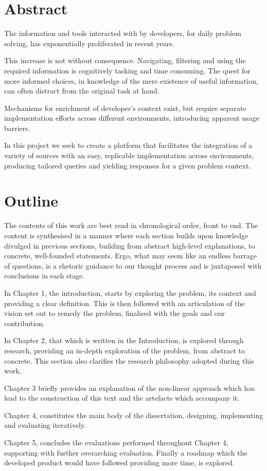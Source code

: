 \chapter*{Abstract}

The information and tools interacted with by developers, for daily problem solving, has exponentially proliferated in recent years. 

This increase is not without consequence. Navigating, filtering and using the required information is cognitively tasking and time consuming. The quest for more informed choices, in knowledge of the mere existence of useful information, can often distract from the original task at hand. 

Mechanisms for enrichment of developer's context exist, but require separate implementation efforts across different environments, introducing apparent usage barriers.

In this project we seek to create a platform that facilitates the integration of a variety of sources with an easy, replicable implementation across environments, producing tailored queries and yielding responses for a given problem context.  



\chapter*{Outline}

The contents of this work are best read in chronological order, front to end. The content is synthesised in a manner where each section builds upon knowledge divulged in previous sections, building from abstract high-level explanations, to concrete, well-founded statements. Ergo, what may seem like an endless barrage of questions, is a rhetoric guidance to our thought process and is juxtaposed with conclusions in each stage.

In Chapter 1, the introduction, starts by exploring the problem, its context and providing a clear definition. This is then followed with an articulation of the vision set out to remedy the problem, finalised with the goals and our contribution.

In Chapter 2, that which is written in the Introduction, is explored through research, providing an in-depth exploration of the problem, from abstract to concrete. This section also clarifies the research philosophy adopted during this work.

Chapter 3 briefly provides an explanation of the non-linear approach which has lead to the construction of this text and the artefacts which accompany it.

Chapter 4, constitutes the main body of the dissertation, designing, implementing and evaluating iteratively.

Chapter 5, concludes the evaluations performed throughout Chapter 4, supporting with further overarching evaluation. Finally a roadmap which the developed product would have followed providing more time, is explored.